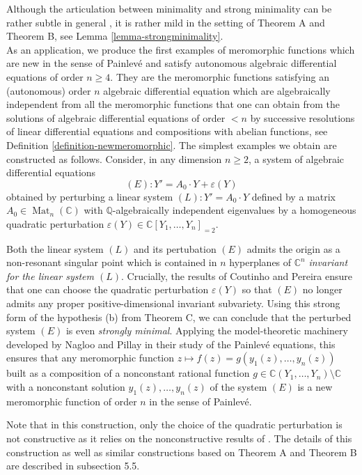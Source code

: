 \documentclass[12pt]{amsart}
\DeclareMathOperator{\Mat}{Mat}
\theoremstyle{definition}
\theoremstyle{plain}
\theoremstyle{exampstyle}
\theoremstyle{exampstyle}\newtheorem{thmxbis}{Theorem}
\numberwithin{equation}{section}
\theoremstyle{remark}
\begin{document}
Although the articulation between minimality and strong minimality can be rather subtle in general \cite{Hrushovski-Scanlon,Pila-Scanlon}, it is rather mild in the setting of Theorem A and Theorem B, see Lemma \ref{lemma-strongminimality}. \\




As an application, we produce the first examples of meromorphic functions which are new in the sense of Painlevé and satisfy autonomous algebraic differential equations of order $n \geq 4$. They are the meromorphic functions satisfying an (autonomous) order $n$ algebraic differential equation which are algebraically independent from all the meromorphic functions that one can obtain from the solutions of algebraic differential equations of order $< n$ by successive resolutions of linear differential equations and compositions with abelian functions, see Definition \ref{definition-newmeromorphic}. The simplest examples we obtain are constructed as follows. Consider, in any dimension $n \geq 2$, a system of algebraic differential equations
$$ (E): Y' = A_0 \cdot Y + \varepsilon(Y) $$
obtained by perturbing a linear system $(L): Y' = A_0 \cdot Y$ defined by a matrix $A_0 \in \Mat_n(\mathbb{C})$ with $\mathbb{Q}$-algebraically independent eigenvalues by a homogeneous quadratic perturbation $\varepsilon(Y) \in \mathbb{C}[Y_1,\ldots,Y_n]_{= 2}$. 

Both the linear system $(L)$ and its pertubation $(E)$ admits the origin as a non-resonant singular point which is contained in $n$ hyperplanes of $\mathbb{C}^n$ {\em invariant for the linear system $(L)$}. Crucially, the results of Coutinho and Pereira \cite{Coutinho-Pereira,Coutinho} ensure that one can choose the quadratic perturbation $\varepsilon(Y)$ so that $(E)$ no longer admits any proper positive-dimensional invariant subvariety. Using this strong form of the hypothesis (b) from Theorem C, we can conclude that the perturbed system $(E)$ is even {\em strongly minimal}. Applying the model-theoretic machinery developed by Nagloo and Pillay \cite{Nagloo-Pillay1} in their study of the Painlevé equations, this ensures that any meromorphic function $z \mapsto f(z) = g (y_1(z),\ldots, y_n(z))$
built as a composition of a nonconstant rational function $g \in \mathbb{C}(Y_1,\ldots, Y_n) \setminus \mathbb{C}$ with a nonconstant solution $y_1(z),\ldots, y_n(z)$ of the system $(E)$ is a new meromorphic function of order $n$ in the sense of Painlevé.

Note that in this construction, only the choice of the quadratic perturbation is not constructive as it relies on the nonconstructive results of \cite{Coutinho-Pereira}. The details of this construction as well as similar constructions based on Theorem A and Theorem B are described in subsection 5.5.
\end{document}
